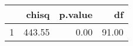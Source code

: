 \begin{table}[ht]
\centering
\begin{tabular}{rrrr}
  \hline
 & chisq & p.value & df \\ 
  \hline
1 & 443.55 & 0.00 & 91.00 \\ 
   \hline
\end{tabular}
\label{tab:bartlettTest}
\end{table}
